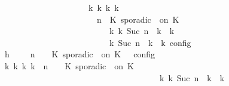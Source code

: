 \begin{isabellebody}
\ \ \ \ \ \ \ \ \ \ \ \ \ \ \ \ \ \ \ \ {\isasymLongrightarrow}\ {\isasymexists}{\isasymGamma}\isactrlsub k\ {\isasymPsi}\isactrlsub k\ {\isasymPhi}\isactrlsub k\ k{\isachardot}\isanewline
\ \ \ \ \ \ \ \ \ \ \ \ \ \ \ \ \ \ \ \ \ \ {\isacharparenleft}{\isacharparenleft}{\isasymGamma}{\isacharcomma}\ n\ {\isasymturnstile}\ {\isacharparenleft}{\isacharparenleft}K\ sporadic\ {\isasymtau}\ on\ K\ {\isacharhash}\ {\isasymPsi}{\isacharparenright}\ {\isasymtriangleright}\ {\isasymPhi}{\isacharparenright}\isanewline
\ \ \ \ \ \ \ \ \ \ \ \ \ \ \ \ \ \ \ \ \ \ \ \ \ \ {\isasymhookrightarrow}\isactrlbsup k\isactrlesup \ {\isacharparenleft}{\isasymGamma}\isactrlsub k{\isacharcomma}\ Suc\ n\ {\isasymturnstile}\ {\isasymPsi}\isactrlsub k\ {\isasymtriangleright}\ {\isasymPhi}\isactrlsub k{\isacharparenright}{\isacharparenright}\isanewline
\ \ \ \ \ \ \ \ \ \ \ \ \ \ \ \ \ \ \ \ \ \ {\isasymand}\ {\isasymrho}\ {\isasymin}\ {\isasymlbrakk}\ {\isasymGamma}\isactrlsub k{\isacharcomma}\ Suc\ n\ {\isasymturnstile}\ {\isasymPsi}\isactrlsub k\ {\isasymtriangleright}\ {\isasymPhi}\isactrlsub k\ {\isasymrbrakk}\isactrlsub c\isactrlsub o\isactrlsub n\isactrlsub f\isactrlsub i\isactrlsub g{\isacartoucheclose}\isanewline
\ \ \ \ \ \ \ \ \isamarkupfalse%
\ {\isacharminus}\isanewline
\ \ \ \ \ \ \ \ \ \ \isamarkupfalse%
\ h{}{\isacharcolon}\ {\isacartoucheopen}{\isasymrho}\ {\isasymin}\ {\isasymlbrakk}\ {\isasymGamma}{\isacharcomma}\ n\ {\isasymturnstile}\ {\isasymPsi}\ {\isasymtriangleright}\ {\isacharparenleft}{\isacharparenleft}K\ sporadic\ {\isasymtau}\ on\ K\ {\isacharhash}\ {\isasymPhi}{\isacharparenright}\ {\isasymrbrakk}\isactrlsub c\isactrlsub o\isactrlsub n\isactrlsub f\isactrlsub i\isactrlsub g{\isacartoucheclose}\isanewline
\ \ \ \ \ \ \ \ \ \ \isamarkupfalse%
\ {\isacartoucheopen}{\isasymexists}{\isasymGamma}\isactrlsub k\ {\isasymPsi}\isactrlsub k\ {\isasymPhi}\isactrlsub k\ k{\isachardot}\ {\isacharparenleft}{\isacharparenleft}{\isasymGamma}{\isacharcomma}\ n\ {\isasymturnstile}\ {\isasymPsi}\ {\isasymtriangleright}\ {\isacharparenleft}{\isacharparenleft}K\ sporadic\ {\isasymtau}\ on\ K\ {\isacharhash}\ {\isasymPhi}{\isacharparenright}{\isacharparenright}\isanewline
\ \ \ \ \ \ \ \ \ \ \ \ \ \ \ \ \ \ \ \ \ \ \ \ \ \ \ \ \ \ \ \ \ \ \ \ \ \ {\isasymhookrightarrow}\isactrlbsup k\isactrlesup \ {\isacharparenleft}{\isasymGamma}\isactrlsub k{\isacharcomma}\ Suc\ n\ {\isasymturnstile}\ {\isasymPsi}\isactrlsub k\ {\isasymtriangleright}\ {\isasymPhi}\isactrlsub k{\isacharparenright}{\isacharparenright}\isanewline

\end{isabellebody}
